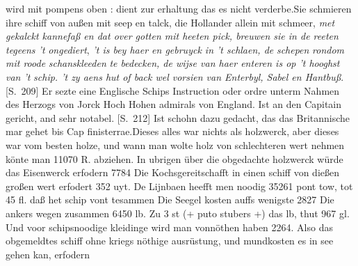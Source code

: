 wird mit pompens\protect{} oben : dient zur erhaltung das es nicht verderbe.\pend \pstart  Sie schmieren ihre schiff\protect{} von außen mit seep\protect{} en talck\protect{}, die Hollander  allein mit schmeer\protect{}, \textit{met gekalckt kannefaß en dat over  gotten mit heeten pick, breuwen sie in de reeten tegeens 't }\textit{ongediert}\protect{}, \textit{'t is bey haer en gebruyck in 't schlaen, de }\textit{schepen}\protect{}\textit{ rondom mit  roode }\textit{schans\textendash kleeden}\protect{}\textit{ te bedecken, de wijse van haer enteren is op  't hooghst van 't }\textit{schip}\protect{}\textit{. 't zy aens hut of back wel vorsien van Enterbyl,  Sabel en Hantbuß}. [S.~209] Er sezte eine Englische Schips Instruction\protect{} oder ordre\protect{} unterm Nahmen des Herzogs von Jorck\protect{} Hoch Hohen admirals\protect{}  von England\protect{}. Ist an den Capitain\protect{} gericht, and sehr notabel. [S.~212] Ist schohn dazu  gedacht, das das Britannische mar\protect{} gehet bis Cap finisterrae\protect{}.\pend \pstart  [?] Dieses alles war nichts als holzwerck, aber dieses  war vom besten holze\protect{}, und wann man wolte holz\protect{} von  schlechteren wert nehmen k\"{o}nte man 11070 R. abziehen.  In ubrigen \"{u}ber die obgedachte holzwerck w\"{u}rde das  Eisenwerck erfodern 7784  \pend \pstart  Die Kochsgereitschafft\protect{} in einen schiff\protect{} von dießen großen wert erfodert 352  uyt. De Lijnbaen heefft men noodig 35261 pont tow,  tot 45 fl.  daß het schip\protect{} vont tesammen   Die Seegel\protect{} kosten auffs wenigste 2827  Die ankers\protect{} wegen zusammen 6450 lb. Zu 3 st (+ puto stubers +)  das lb, thut 967 gl. Und voor schips\textendash noodige  kleidinge wird man vonn\"{o}then haben 2264.  Also das obgemeldtes schiff\protect{} ohne kriegs n\"{o}thige  ausr\"{u}stung, und mund\textendash kosten  es in see gehen kan, erfodern 